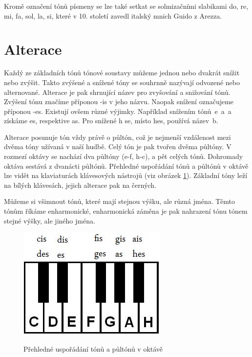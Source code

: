 Kromě označení tónů písmeny se lze také setkat se solmizačními slabikami do, re, mi, fa, sol, la, si,
které v 10. století zavedl italský mnich Guido z Arezza.
\cite{cmiral}
\par    

\section{Alterace}
Každý ze základních tónů tónové soustavy můžeme jednou nebo dvakrát snížit nebo zvýšit.
Takto zvýšené a snížené tóny se souhrnně nazývají odvozené nebo alternované.
Alterace je pak shrnující název pro zvyšování a snižování tónů.
Zvýšení tónu značíme příponou -is v jeho názvu.
Naopak snížení označujeme příponou -es.
Existují ovšem různé výjimky.
Například snížením tónů~e~a~a získáme es, respektive as.
Pro snížené h se, místo hes, používá název~b.
\cite{zenkl}
\par

Alterace posunuje tón vždy právě o půltón, 
což je nejmenší vzdálenost mezi dvěma tóny užívaná v naší hudbě.
Celý tón je pak tvořen dvěma půltóny. 
V rozmezí oktávy se nachází dva půltóny ({e-f, h-c}), a pět celých tónů.
Dohromady oktáva sestává z dvanácti půltónů.
Přehledné uspořádání tónů a půltónů v oktávě lze vidět na klaviaturách klávesových nástrojů (viz obrázek \ref{obrazekRozlozeniKlaviatury}).
Základní tóny leží na bílých klávesách, jejich alterace pak na černých.
\cite{zenkl,cmiral}
\par

Můžeme si všimnout tónů, které mají stejnou výšku, ale různá jména.
Těmto tónům říkáme enharmonické, enharmonická záměna je pak nahrazení tónu tónem stejné výšky, ale jiného jména.\cite{zenkl}

\begin{figure}[h]\centering
    \centering
    \includegraphics[width=0.4\linewidth]{obrazky/klaviatura.jpg}\\[1pt]  
    \caption{Přehledné uspořádání tónů a půltónů v oktávě \cite{orientaceNaKlaviature}}    
    \label{obrazekRozlozeniKlaviatury}
\end{figure}

